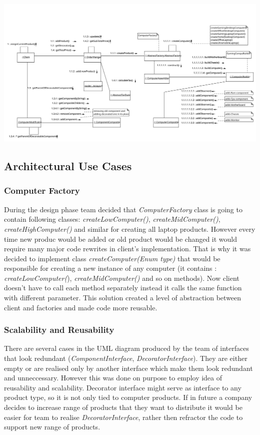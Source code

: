 \documentclass[pdftex,11pt,a4paper]{article}
\begin{document}
\begin{center}
	\includegraphics[scale=0.75]{images/CollaborationDiagram.svg}
\end{center}

\subsection{Architectural Use Cases}

\subsubsection{Computer Factory}
During the design phase team decided that \emph{ComputerFactory} class is going to contain following classes: \emph{createLowComputer()}, \emph{createMidComputer()}, \emph{createHighComputer()} and similar for creating all laptop products. However every time new produc would be added or old product would be changed it would require many major code rewrites in client's implementation. That is why it was decided to implement class \emph{createComputer(Enum type)} that would be responsible for creating a new instance of any computer (it contains : \emph{createLowComputer(}), \emph{createMidComputer()} and so on methods). Now client doesn't have to call each method separately instead it calls the same function with different parameter. This solution created a level of abstraction between client and factories and made code more reusable.

\subsubsection{Scalability and Reusability}
There are several cases in the UML diagram produced by the team of interfaces that look redundant (\emph{ComponentInterface}, \emph{DecoratorInterface}). They are either empty or are realised only by another interface which make them look redundant and unneccessary. However this was done on purpose to employ idea of reusability and scalability. Decorator interface might serve as interface to any product type, so it is not only tied to computer products. If in future a company decides to increase range of products that they want to distribute it would be easier for team to realise \emph{DecoratorInterface}, rather then refractor the code to support new range of products. 
\end{document}
